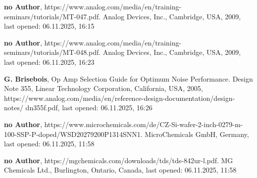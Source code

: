 \documentclass[12pt, a4paper]{article}
\begin{document}
\begin{thebibliography}{}
	\textbf{no Author}, https://www.analog.com/media/en/training-seminars/tutorials/MT-047.pdf. Analog Devices, Inc., Cambridge, USA, 2009, last opened: 06.11.2025, 16:15
	
	\textbf{no Author}, https://www.analog.com/media/en/training-seminars/tutorials/MT-048.pdf. Analog Devices, Inc., Cambridge, USA, 2009, last opened: 06.11.2025, 16:23
	
	\textbf{G. Brisebois}, Op Amp Selection Guide for Optimum Noise Performance. Design Note 355, Linear Technology Corporation, California, USA, 2005, https://www.analog.com/media/en/reference-design-documentation/design-notes/ dn355f.pdf, last opened: 06.11.2025, 16:26
	
	
	\textbf{no Author}, https://www.microchemicals.com/de/CZ-Si-wafer-2-inch-0279-m-100-SSP-P-doped/WSD20279200P1314SNN1. MicroChemicals GmbH, Germany, last opened: 06.11.2025, 11:58
	
	\textbf{no Author}, https://mgchemicals.com/downloads/tds/tds-842ur-l.pdf. MG Chemicals Ltd., Burlington, Ontario, Canada, last opened: 06.11.2025, 11:58
	
	
\end{thebibliography}
\end{document}

